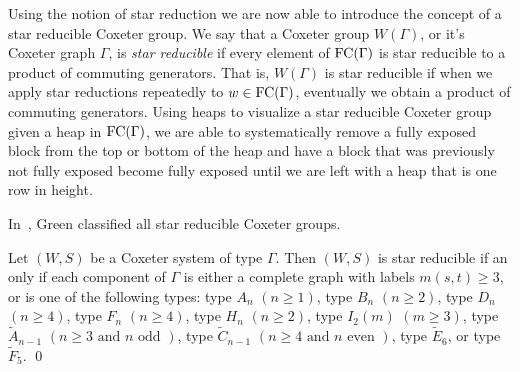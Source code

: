 Using the notion of star reduction we are now able to introduce the concept of a star reducible Coxeter group. We say that a Coxeter group $W(\Gamma)$, or it's Coxeter graph $\Gamma$, is \emph{star reducible} if every element of $\mathrm{FC}(\Gamma)$ is star reducible to a product of commuting generators. That is, $W(\Gamma)$ is star reducible if when we apply star reductions repeatedly to $w \in \mathrm{FC}(\Gamma)$, eventually we obtain a product of commuting generators. Using heaps to visualize a star reducible Coxeter group given a heap in $\mathrm{FC}(\Gamma)$, we are able to systematically remove a fully exposed block from the top or bottom of the heap and have a block that was previously not fully exposed become fully exposed until we are left with a heap that is one row in height. 

In~\cite{Green2006a}, Green classified all star reducible Coxeter groups.

\begin{theorem}
	Let $(W,S)$ be a Coxeter system of type $\Gamma$. Then $(W,S)$ is star reducible if an only if each component of $\Gamma$ is either a complete graph with labels $m(s,t)\geq 3$, or is one of the following types: type $A_n$ $(n \geq 1)$, type $B_n$ $(n \geq 2)$, type $D_n$ $(n \geq 4)$, type $F_n$ $(n \geq 4)$, type $H_n$ $(n \geq 2)$, type $I_2(m)$ $(m \geq 3)$, type $\widetilde{A}_{n-1}$ $(n \geq 3 \textrm{ and } n \textrm{ odd })$, type $\widetilde{C}_{n-1}$ $(n\geq 4 \textrm{ and } n \textrm{ even })$, type $\widetilde{E}_6$, or type $\widetilde{F}_5$. \qed
\end{theorem}  


